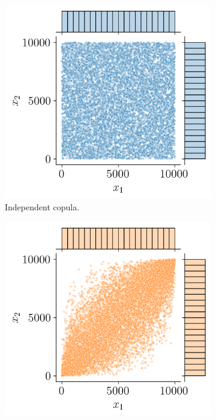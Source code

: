 \begin{figure}
    \centering
    \begin{subfigure}[b]{0.32\textwidth}
        \centering
        \includegraphics[width=\textwidth]{../numerical_experiments/chapter1/figures/independent_copula_ranked.png}
        \caption{Independent copula.}
    \end{subfigure}
    \hfill
    \begin{subfigure}[b]{0.32\textwidth}
        \centering
        \includegraphics[width=\textwidth]{../numerical_experiments/chapter1/figures/normal_copula_ranked.png}

\end{subfigure}
\end{figure}

